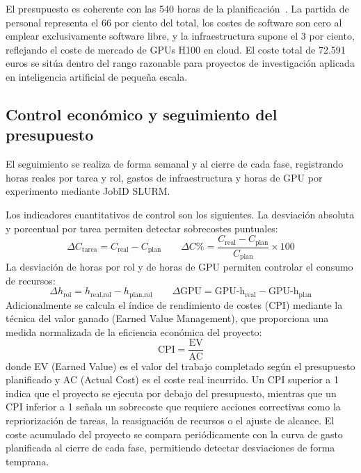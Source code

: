 \documentclass[11pt,a4paper]{article}
\begin{document}
\noindent El presupuesto es coherente con las 540 horas de la planificación~\cite{gep23e2}. La partida de personal representa el 66 por ciento del total, los costes de software son cero al emplear exclusivamente software libre, y la infraestructura supone el 3 por ciento, reflejando el coste de mercado de GPUs H100 en cloud. El coste total de 72.591 euros se sitúa dentro del rango razonable para proyectos de investigación aplicada en inteligencia artificial de pequeña escala.

\subsection{Control económico y seguimiento del presupuesto}

El seguimiento se realiza de forma semanal y al cierre de cada fase, registrando horas reales por tarea y rol, gastos de infraestructura y horas de GPU por experimento mediante JobID SLURM.

Los indicadores cuantitativos de control son los siguientes. La desviación absoluta y porcentual por tarea permiten detectar sobrecostes puntuales:
\[
\Delta C_{\text{tarea}} = C_{\text{real}} - C_{\text{plan}} \qquad
\Delta C\% = \frac{C_{\text{real}} - C_{\text{plan}}}{C_{\text{plan}}} \times 100
\]
La desviación de horas por rol y de horas de GPU permiten controlar el consumo de recursos:
\[
\Delta h_{\text{rol}} = h_{\text{real,rol}} - h_{\text{plan,rol}} \qquad
\Delta \text{GPU} = \text{GPU-h}_{\text{real}} - \text{GPU-h}_{\text{plan}}
\]
Adicionalmente se calcula el índice de rendimiento de costes (CPI) mediante la técnica del valor ganado (Earned Value Management), que proporciona una medida normalizada de la eficiencia económica del proyecto:
\[
\text{CPI} = \frac{\text{EV}}{\text{AC}}
\]
donde EV (Earned Value) es el valor del trabajo completado según el presupuesto planificado y AC (Actual Cost) es el coste real incurrido. Un CPI superior a 1 indica que el proyecto se ejecuta por debajo del presupuesto, mientras que un CPI inferior a 1 señala un sobrecoste que requiere acciones correctivas como la repriorización de tareas, la reasignación de recursos o el ajuste de alcance. El coste acumulado del proyecto se compara periódicamente con la curva de gasto planificada al cierre de cada fase, permitiendo detectar desviaciones de forma temprana.
\end{document}
